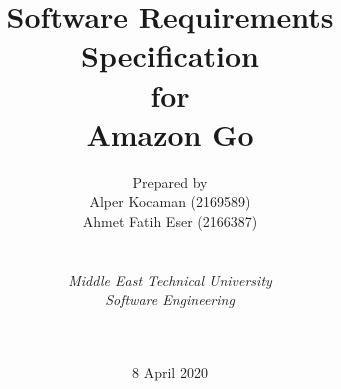 
\def\Company{METU}
\def\Institute{\textit{Middle East Technical University}}
\def\Course{\textit{Software Engineering}}
\def\Module{\textit{}}
\def\Docent{\textit{}}
\def\Assistant{\textit{}}

\def\BoldTitle{Software Requirements Specification}

\def\Subtitle{for \\ Amazon Go \\}
\def\Authors{Prepared by \\ Alper Kocaman (2169589) \\ Ahmet Fatih Eser (2166387) }
\def\Shortname{A.Sandu}


\title{\textbf{\BoldTitle}\\\Subtitle}
\author{\Authors \\ \\ \\ \Institute\\ \Course\\ \Module\\ \Docent\\ \Assistant}
\date{8 April 2020}

